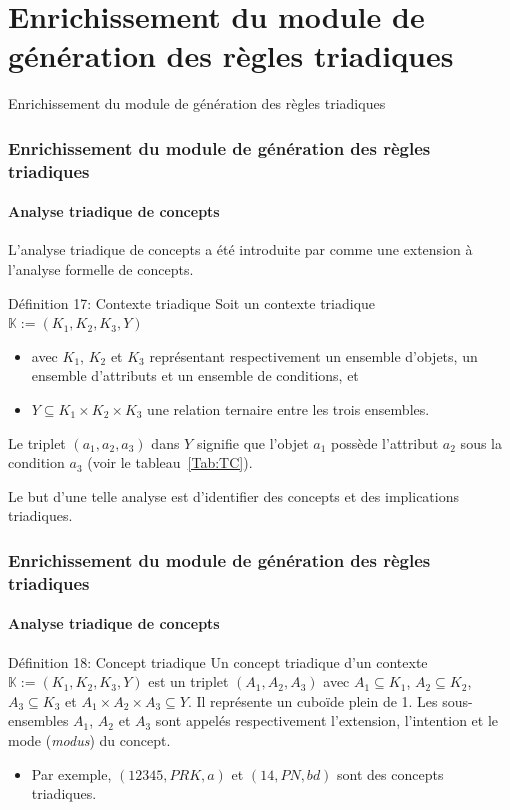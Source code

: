 \documentclass[french]{beamer}
\def\KK{\mathbb{K}}
\begin{document}
\section[Triadique]{Enrichissement du module de génération des règles triadiques}
\begin{frame}
\large{\centerline{Enrichissement du module de génération des règles triadiques}}
\end{frame}
\begin{frame}
\frametitle{Enrichissement du module de génération des règles triadiques}
\framesubtitle{Analyse triadique de concepts}
L'analyse triadique de concepts a été introduite par \parencite{Lehmann1995} comme une extension à l'analyse formelle de concepts.
\begin{block}{Définition 17: Contexte triadique}
Soit un contexte triadique $\KK:=(K_1, K_2, K_3, Y)$ 
\begin{itemize}
\item avec $K_1$, $K_2$ et $K_3$ représentant respectivement un ensemble d'objets, un ensemble d'attributs et un ensemble de conditions, et
\item $Y\subseteq K_1{\times}K_2{\times}K_3$ une relation ternaire entre les trois ensembles.
\end{itemize}
Le triplet $(a_1, a_2, a_3)$ dans $Y$ signifie que l'objet $a_1$ possède l'attribut $a_2$ sous la condition $a_3$ (voir le tableau~\ref{Tab:TC}). 
\end{block}
Le but d'une telle analyse est d'identifier des concepts et des implications triadiques.
\end{frame}
\begin{frame}
\frametitle{Enrichissement du module de génération des règles triadiques}
\framesubtitle{Analyse triadique de concepts}
\begin{block}{Définition 18: Concept triadique}
Un concept triadique d'un contexte $\KK:=(K_1,K_2,K_3,Y)$ 
 est un triplet $(A_1, A_2, A_3)$ avec $A_1 \subseteq K_1$, $A_2 \subseteq K_2$, $A_3 \subseteq K_3$ et  $A_1{\times}A_2{\times}A_3\subseteq Y$. Il représente un cuboïde plein de 1. Les sous-ensembles $A_1$, $A_2$ et $A_3$ sont appelés respectivement l'extension, l'intention et le mode (\emph{modus}) du concept.
\end{block}
\begin{itemize}
  \item Par exemple, $(12345, PRK, a)$ et $(14, PN, bd)$ sont des concepts triadiques. 
\end{itemize}
\end{frame}
\end{document}

